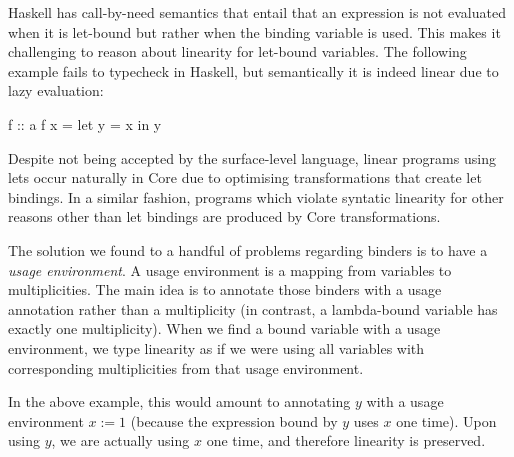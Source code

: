 \documentclass[a4paper, draft]{report}
\begin{document}
Haskell has call-by-need semantics that entail that an expression is not
evaluated when it is let-bound but rather when the binding variable is used.
This makes it challenging to reason about linearity for let-bound variables. The
following example fails to typecheck in Haskell, but semantically it is indeed
linear due to lazy evaluation:

\begin{code}
f :: a %
f x = let y = x in y
\end{code}

Despite not being accepted by the surface-level language, linear programs using
lets occur naturally in Core due to optimising transformations that create let
bindings. In a similar fashion, programs which violate syntatic linearity
for other reasons other than let bindings are produced by Core transformations.

The solution we found to a handful of problems regarding binders is to have a
\emph{usage environment}. A usage environment is a mapping from variables to
multiplicities. The main idea is to annotate those binders with a usage
annotation rather than a multiplicity (in contrast, a lambda-bound variable has
exactly one multiplicity). When we find a bound variable with a usage
environment, we type linearity as if we were using all variables with
corresponding multiplicities from that usage environment.

In the above example, this would amount to annotating $y$ with a usage
environment $x := 1$ (because the expression bound by $y$ uses $x$ one time).
Upon using $y$, we are actually using $x$ one time, and therefore linearity is
preserved.



\end{document}
